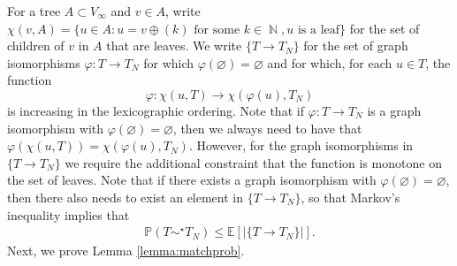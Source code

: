 \documentclass[11pt]{article}
\numberwithin{equation}{section}
\DeclareMathOperator{\N}{\mathbb{N}} %
\newcommand{\p}{\mathbb{P}} %
\newcommand{\E}{\mathbb{E}} %
\theoremstyle{definition}
\begin{document}
For a tree $A \subset V_\infty$ and $v\in A$, write $\chi(v,A) = \{u \in A : u=v\oplus (k) \text{ for some } k\in \N, u \text{ is a leaf}\}$ for the set of children of $v$ in $A$ that are leaves. We write $\{T \to T_N\}$ for the set of graph isomorphisms $\varphi : T \to T_N$ for which $\varphi(\varnothing) = \varnothing$ and for which, for each $u \in T$, the function
\begin{equation*}
    \varphi : \chi(u,T) \to \chi(\varphi(u), T_N)
\end{equation*}
is increasing in the lexicographic ordering. Note that if $\varphi : T \to T_N$ is a graph isomorphism with $\varphi(\varnothing) = \varnothing$, then we always need to have that $\varphi ( \chi(u,T)) = \chi(\varphi(u), T_N)$. However, for the graph isomorphisms in $\{T \to T_N\}$ we require the additional constraint that the function is monotone on the set of leaves. Note that if there exists a graph isomorphism with $\varphi(\varnothing) = \varnothing$, then there also needs to exist an element in $\{T\to T_N\}$, so that Markov's inequality implies that
\begin{align}\label{markovtrick}
    \p (T \sim^\star T_N ) \leq \E \left[ \left| \{ T \to T_N \} \right| \right] .
\end{align}
Next, we prove Lemma \ref{lemma:matchprob}.
\end{document}
